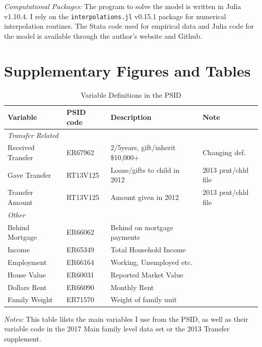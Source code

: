 \documentclass[12pt]{article}
\begin{document}
\textit{Computational Packages:}
The program to solve the model is written in Julia v1.10.4. I rely on the \texttt{interpolations.jl} v0.15.1 package for numerical interpolation routines. The Stata code used for empirical data and Julia code for the model is available through the author's website and Github.



\section{Supplementary Figures and Tables}
\begin{table}
	\small	
	\caption{Variable Definitions in the PSID}\label{tab:vardef}
	\begin{threeparttable}
	\begin{tabular}{@{}llll@{}}
		\toprule
		Variable& PSID code & Description & Note \\ \midrule
		\textit{Transfer Related} \\ 
		Received Transfer & ER67962 & 2/5years, gift/inherit \$10,000+ & Changing def. \\
		Gave Transfer & RT13V125 & Loans/gifts to child  in 2012 & 2013
		prnt/chld file \\ 
		Transfer Amount & RT13V125 & Amount given in 2012 & 2013 prnt/chld file \\
		\textit{Other} \\ 
		Behind Mortgage & ER66062  & Behind on mortgage payments\\
		Income & ER65349 & Total Household Income &  \\
		Employment & ER66164 & Working, Unemployed etc. \\
		House Value & ER60031 & Reported Market Value &  \\
		Dollars Rent &	ER66090 & Monthly Rent\\
		Family Weight &		ER71570 & Weight of family unit &  \\
		\bottomrule
	\end{tabular}
	{\textit{Notes:} This table lilsts the main variables I use from the PSID, as well as their variable code in the 2017 Main family level data set or the 2013 Transfer supplement.}
	\end{threeparttable}
	
\end{table}
\end{document}
